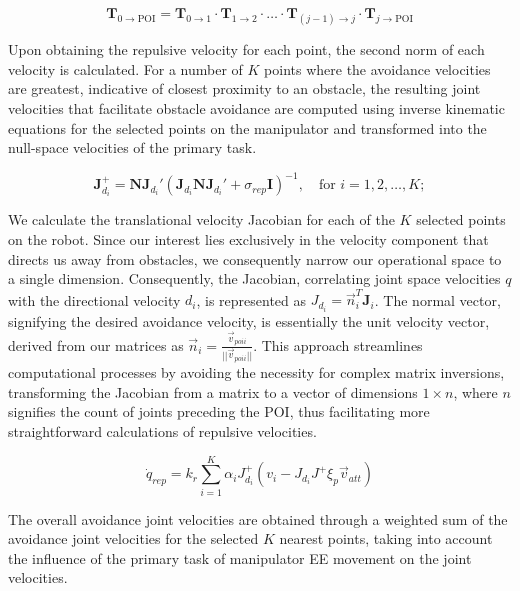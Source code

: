 \documentclass[letterpaper, 10 pt, conference]{ieeeconf}  %
\begin{document}
\begin{equation}
	\mathbf{T}_{0 \rightarrow \text{POI}} = \mathbf{T}_{0 \rightarrow 1} \cdot \mathbf{T}_{1 \rightarrow 2} \cdot \ldots \cdot \mathbf{T}_{(j-1) \rightarrow j} \cdot \mathbf{T}_{j \rightarrow \text{POI}}	
	\label{eq:transformations}
\end{equation}

Upon obtaining the repulsive velocity for each point, the second norm of each velocity is calculated. For a number of $K$ points where the avoidance velocities are greatest, indicative of closest proximity to an obstacle, the resulting joint velocities that facilitate obstacle avoidance are computed using inverse kinematic equations for the selected points on the manipulator and transformed into the null-space velocities of the primary task.

\begin{equation}
	\mathbf{J}_{d_i}^{+} = \mathbf{N} \mathbf{J}_{d_i}' (\mathbf{J}_{d_i} \mathbf{N} \mathbf{J}_{d_i}' + \sigma_{rep} \mathbf{I})^{-1}, \quad \text{for } i = 1, 2, \ldots, K;
\end{equation}

We calculate the translational velocity Jacobian for each of the $K$ selected points on the robot. Since our interest lies exclusively in the velocity component that directs us away from obstacles, we consequently narrow our operational space to a single dimension. Consequently, the Jacobian, correlating joint space velocities \(q\) with the directional velocity \(d_i\), is represented as \(J_{d_i} = \vec{n}_i^T \mathbf{J}_i\). The normal vector, signifying the desired avoidance velocity, is essentially the unit velocity vector, derived from our matrices as \(\vec{n}_{i} = \frac{\vec{v}_{poi i}}{||\vec{v}_{poi i}||}\). This approach streamlines computational processes by avoiding the necessity for complex matrix inversions, transforming the Jacobian from a matrix to a vector of dimensions \(1 \times n\), where \(n\) signifies the count of joints preceding the POI, thus facilitating more straightforward calculations of repulsive velocities.

\begin{equation}
	\dot{q}_{rep} = k_r \sum_{i=1}^{K} \alpha_i J_{d_i}^{+} \left(v_i - J_{d_i} J^{+} \xi_{p} \vec{v}_{att}\right)
\end{equation}

The overall avoidance joint velocities are obtained through a weighted sum of the avoidance joint velocities for the selected \(K\) nearest points, taking into account the influence of the primary task of manipulator EE movement on the joint velocities.
\end{document}
